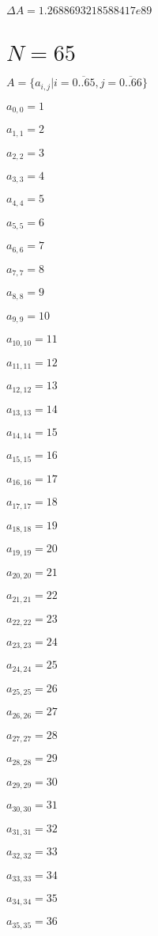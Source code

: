 \documentclass[a4paper,12pt]{article}
\begin{document}
$\Delta A = 1.2688693218588417e89$



\section{ $N = 65$ }
$A = \{ a _{ i, j } | i = \overline { 0..65 }, j = \overline { 0..66 } \}$

$a _{ 0, 0 } = 1$

$a _{ 1, 1 } = 2$

$a _{ 2, 2 } = 3$

$a _{ 3, 3 } = 4$

$a _{ 4, 4 } = 5$

$a _{ 5, 5 } = 6$

$a _{ 6, 6 } = 7$

$a _{ 7, 7 } = 8$

$a _{ 8, 8 } = 9$

$a _{ 9, 9 } = 10$

$a _{ 10, 10 } = 11$

$a _{ 11, 11 } = 12$

$a _{ 12, 12 } = 13$

$a _{ 13, 13 } = 14$

$a _{ 14, 14 } = 15$

$a _{ 15, 15 } = 16$

$a _{ 16, 16 } = 17$

$a _{ 17, 17 } = 18$

$a _{ 18, 18 } = 19$

$a _{ 19, 19 } = 20$

$a _{ 20, 20 } = 21$

$a _{ 21, 21 } = 22$

$a _{ 22, 22 } = 23$

$a _{ 23, 23 } = 24$

$a _{ 24, 24 } = 25$

$a _{ 25, 25 } = 26$

$a _{ 26, 26 } = 27$

$a _{ 27, 27 } = 28$

$a _{ 28, 28 } = 29$

$a _{ 29, 29 } = 30$

$a _{ 30, 30 } = 31$

$a _{ 31, 31 } = 32$

$a _{ 32, 32 } = 33$

$a _{ 33, 33 } = 34$

$a _{ 34, 34 } = 35$

$a _{ 35, 35 } = 36$
\end{document}
